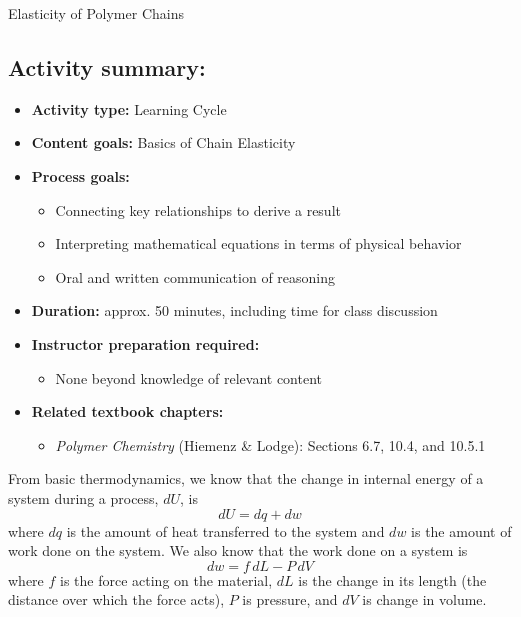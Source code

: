 \begin{activity}{Elasticity of Polymer Chains}
\begin{instructornotes}
	\subsection*{Activity summary:}
	\begin{itemize}
		\item \textbf{Activity type:} Learning Cycle
		\item \textbf{Content goals:} Basics of Chain Elasticity
		\item \textbf{Process goals:} %
			\begin{itemize}
				\item Connecting key relationships to derive a result
				\item Interpreting mathematical equations in terms of physical behavior
				\item Oral and written communication of reasoning
			\end{itemize}
		\item \textbf{Duration:} approx. 50 minutes, including time for class discussion
		\item \textbf{Instructor preparation required:} 
			\begin{itemize}
				\item None beyond knowledge of relevant content
			\end{itemize}
		\item \textbf{Related textbook chapters:}
			\begin{itemize}
				\item \emph{Polymer Chemistry} (Hiemenz \& Lodge): Sections 6.7, 10.4, and 10.5.1
			\end{itemize}
	\end{itemize}

\end{instructornotes}


\begin{model}
\label{\labelbase:mdl:delG}

	From basic thermodynamics, we know that the change in internal energy of a system during a process, $dU$, is
	\begin{equation*}
		dU = dq + dw
	\end{equation*}
	where $dq$ is the amount of heat transferred to the system and $dw$ is the amount of work done on the system.  We also know that the work done on a system is
	\begin{equation*}
		dw = f\,dL - P\,dV
	\end{equation*}
	where $f$ is the force acting on the material, $dL$ is the change in its length (the distance over which the force acts), $P$ is pressure, and $dV$ is change in volume.
	

\end{model}
\end{activity}
